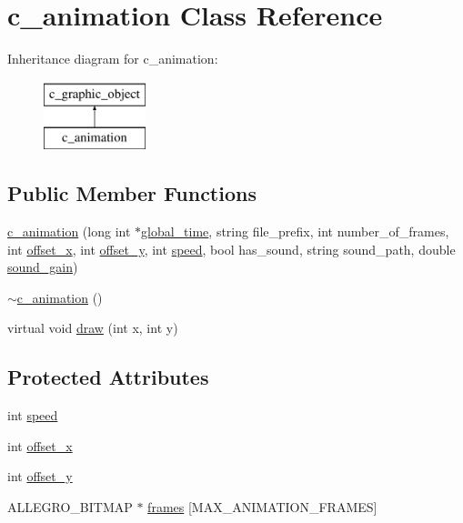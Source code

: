 \hypertarget{classc__animation}{\section{c\-\_\-animation Class Reference}
\label{classc__animation}
}
Inheritance diagram for c\-\_\-animation\-:\begin{figure}[H]
\begin{center}
\leavevmode
\includegraphics[height=2.000000cm]{classc__animation}
\end{center}
\end{figure}
\subsection*{Public Member Functions}
\begin{DoxyCompactItemize}
\item 
\hyperlink{classc__animation_af98386490424ee6265da7edd9bf6436f}{c\-\_\-animation} (long int $\ast$\hyperlink{classc__graphic__object_a9ff91aa7a60272a8f713ff011a0cc0bb}{global\-\_\-time}, string file\-\_\-prefix, int number\-\_\-of\-\_\-frames, int \hyperlink{classc__animation_a94a4d0e669cf48082e293c8d811e5ca4}{offset\-\_\-x}, int \hyperlink{classc__animation_acb05e62189bcbac633c9290016c25415}{offset\-\_\-y}, int \hyperlink{classc__animation_acbb0e4a3a678ecf74b91e23c22eaa29a}{speed}, bool has\-\_\-sound, string sound\-\_\-path, double \hyperlink{classc__graphic__object_a8274f6e9f1221b91be61ca923e1dc03c}{sound\-\_\-gain})
\item 
\hyperlink{classc__animation_a1b4c0a7b17edb2ac92daa6fbd8afcd93}{$\sim$c\-\_\-animation} ()
\item 
virtual void \hyperlink{classc__animation_a36d69237de6781450680a38717385721}{draw} (int x, int y)
\end{DoxyCompactItemize}
\subsection*{Protected Attributes}
\begin{DoxyCompactItemize}
\item 
int \hyperlink{classc__animation_acbb0e4a3a678ecf74b91e23c22eaa29a}{speed}
\item 
int \hyperlink{classc__animation_a94a4d0e669cf48082e293c8d811e5ca4}{offset\-\_\-x}
\item 
int \hyperlink{classc__animation_acb05e62189bcbac633c9290016c25415}{offset\-\_\-y}
\item 
A\-L\-L\-E\-G\-R\-O\-\_\-\-B\-I\-T\-M\-A\-P $\ast$ \hyperlink{classc__animation_ad881d6653de035e33a8b0ad3e0c178a5}{frames} \mbox{[}M\-A\-X\-\_\-\-A\-N\-I\-M\-A\-T\-I\-O\-N\-\_\-\-F\-R\-A\-M\-E\-S\mbox{]}
\end{DoxyCompactItemize}


